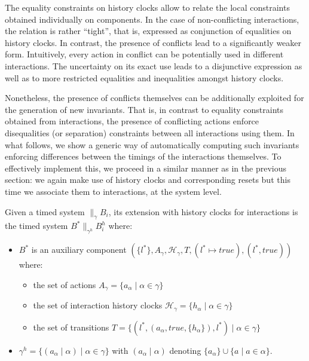 \documentclass{LMCS}
\newcommand{\ha}{\mathcal{H}_{\gamma}}
\newcommand{\cn}{\mathit{B}\xspace}
\newcommand{\true}{\mathit{true}\xspace}
\newcommand{\compgamma}{B^*}
\newcommand{\sysgammah}{\compgamma \|_{\gamma^h} B_i^h}
\newcommand{\dl}{l^*}
\theoremstyle{plain}\newtheorem{remark}[thm]{Remark}
\theoremstyle{plain}\newtheorem{example}[thm]{Example}
\begin{document}
The equality constraints on history clocks allow to relate the local
constraints obtained individually on components.  In the case of
non-conflicting interactions, the relation is rather ``tight'', that is,
expressed as conjunction of equalities on history clocks.  In
contrast, the presence of conflicts lead to a significantly weaker
form.  Intuitively, every action in conflict can be potentially used
in different interactions.  The uncertainty on its exact use leads to
a disjunctive expression as well as to more restricted equalities and
inequalities amongst history clocks.

Nonetheless, the presence of conflicts themselves can be additionally
exploited for the generation of new invariants.  That is, in contrast
to equality constraints obtained from interactions, the presence of
conflicting actions enforce disequalities (or separation) constraints
between all interactions using them. In what follows, we show a
generic way of automatically computing such invariants enforcing
differences between the timings of the interactions themselves. To
effectively implement this, we proceed in a similar manner as in the
previous section: we again make use of history clocks and
corresponding resets but this time we associate them to interactions,
at the system level. 
\begin{defi}
\label{def:sc}
Given a timed system $\|_{\gamma}\cn_i$, its extension with
history clocks for interactions is the timed system $\sysgammah$ where:
\begin{itemize}
\item $\compgamma$ is an auxiliary component $(\{\dl\}, A_\gamma, \ha, T,
  (\dl \mapsto \true), (\dl,\true))$ where:
\begin{itemize}
\item the set of actions $A_{\gamma} = \{a_{\alpha} \mid \alpha \in \gamma\}$
\item the set of interaction history clocks $\ha = \{h_{\alpha} \mid \alpha \in \gamma\}$
\item the set of transitions $T = \{(\dl,( a_{\alpha}, \true, \{ h_{\alpha} \}), \dl)  \mid \alpha \in \gamma\}$
\end{itemize}
\item $\gamma^h = \{ (a_{\alpha} \mid \alpha) \mid \alpha \in \gamma
  \}$ with $(a_{\alpha} \mid \alpha)$ denoting $\{a_{\alpha}\} \cup
  \{a \mid a \in \alpha\}$.
\end{itemize}
\end{defi}
\end{document}

